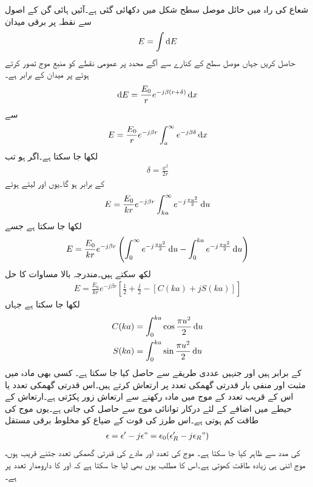 شعاع کی راہ میں حائل موصل سطح شکل میں دکھائی گئی ہے۔آئیں ہائی گن کے اصول سے نقطہ  پر برقی میدان 
\begin{align}
E=\int \dif E
\end{align}
حاصل کریں جہاں موصل سطح کے کنارے سے آگے  محدد پر عمومی نقطے کو منبع موج تصور کرتے ہوئے  پر میدان  کے برابر ہے۔
\begin{align}
\dif E=\frac{E_0}{r} e^{-j \beta (r+\delta)} \dif x
\end{align}
سے
\begin{align}
E=\frac{E_0}{r} e^{-j \beta r} \int_a^{\infty} e^{-j \beta \delta} \dif x
\end{align}
لکھا جا سکتا ہے۔اگر  ہو تب
\begin{align}
\delta=\frac{x^2}{2r}
\end{align}
کے برابر ہو گا۔یوں  اور  لیتے ہوئے
\begin{align}
E=\frac{E_0}{k r} e^{-j \beta r} \int_{k a}^{\infty} e^{-j \frac{\pi u^2}{2}} \dif u
\end{align}
لکھا جا سکتا ہے جسے
\begin{align}
E=\frac{E_0}{k r} e^{-j \beta r} \left(\int_0^{\infty} e^{-j \frac{\pi u^2}{2}} \dif u-\int_0^{k a} e^{-j \frac{\pi u^2}{2}} \dif u \right)
\end{align}
لکھ سکتے ہیں۔مندرجہ بالا مساوات کا حل
\begin{align}
E=\frac{E_0}{k r} e^{-j \beta r} \left[\frac{1}{2}+\frac{j}{2}-\left[C(ka)+jS(ka)\right]\right]
\end{align}
لکھا جا سکتا ہے جہاں
\begin{align}
C(ka)&=\int_{0}^{k a} \cos \frac{\pi u^2}{2} \dif u\\
S(ka)&=\int_{0}^{k a} \sin \frac{\pi u^2}{2} \dif u 
\end{align}
کے برابر ہیں اور جنہیں عددی طریقے سے حاصل کیا جا سکتا ہے۔
کسی بھی مادہ میں مثبت اور منفی بار قدرتی گھمکی تعدد پر ارتعاش کرتے ہیں۔اس قدرتی گھمکی تعدد یا اس کے قریب تعدد کے موج میں مادہ رکھنے سے ارتعاش زور پکڑتی ہے۔ارتعاش کے حیطے میں اضافے کے لئے درکار توانائی موج سے حاصل کی جاتی ہے۔یوں موج کی طاقت کم ہوتی ہے۔اس طرز کی قوت کے ضیاع کو مخلوط برقی مستقل
\begin{align}
\epsilon=\epsilon'-j \epsilon"=\epsilon_0(\epsilon_R'-j\epsilon_R")
\end{align}
 کی مدد سے ظاہر کیا جا سکتا ہے۔ موج کی تعدد اور مادے کی قدرتی گھمکی تعدد جتنے قریب ہوں، موج اتنی ہی زیادہ طاقت کھوتی ہے۔اس کا مطلب یوں بھی لیا جا سکتا ہے کہ  اور  کا دارومدار تعدد پر ہے۔

